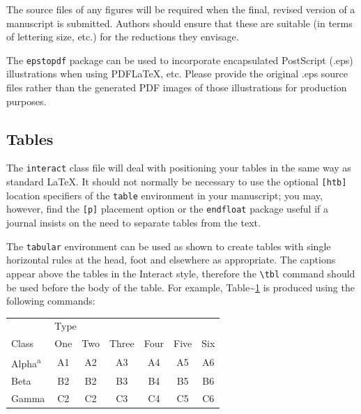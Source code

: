 \documentclass[]{interact}
\theoremstyle{plain}%
\theoremstyle{definition}
\theoremstyle{remark}
\begin{document}
The source files of any figures will be required when the final, revised
version of a manuscript is submitted. Authors should ensure that these
are suitable (in terms of lettering size, etc.) for the reductions they
envisage.

The \texttt{epstopdf} package can be used to incorporate encapsulated
PostScript (.eps) illustrations when using PDF\LaTeX, etc. Please
provide the original .eps source files rather than the generated PDF
images of those illustrations for production purposes.

\hypertarget{tables}{%
\subsection{Tables}\label{tables}}

The \texttt{interact} class file will deal with positioning your tables
in the same way as standard \LaTeX. It should not normally be necessary
to use the optional \texttt{{[}htb{]}} location specifiers of the
\texttt{table} environment in your manuscript; you may, however, find
the \texttt{{[}p{]}} placement option or the \texttt{endfloat} package
useful if a journal insists on the need to separate tables from the
text.

The \texttt{tabular} environment can be used as shown to create tables
with single horizontal rules at the head, foot and elsewhere as
appropriate. The captions appear above the tables in the
\textsf{Interact} style, therefore the \texttt{\textbackslash{}tbl}
command should be used before the body of the table. For example,
Table\textasciitilde{}\ref{sample-table} is produced using the following
commands:

\begin{table}
{\begin{tabular}{lcccccc} \toprule
 & \multicolumn{2}{l}{Type} \\ \cmidrule{2-7}
 Class & One & Two & Three & Four & Five & Six \\ \midrule
 Alpha\textsuperscript{a} & A1 & A2 & A3 & A4 & A5 & A6 \\
 Beta & B2 & B2 & B3 & B4 & B5 & B6 \\
 Gamma & C2 & C2 & C3 & C4 & C5 & C6 \\ \bottomrule
\end{tabular}}
\label{sample-table}
\end{table}
\end{document}
